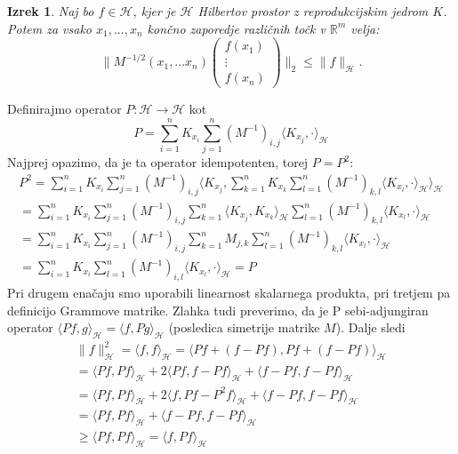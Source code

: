 \documentclass[12pt,a4paper]{amsart}
\theoremstyle{definition} %
\theoremstyle{plain} %
\newtheorem{izrek}[definicija]{Izrek}
\begin{document}
\begin{izrek}
Naj bo $f \in \mathcal{H}$, kjer je $\mathcal{H}$ Hilbertov prostor z reprodukcijskim jedrom $K$. Potem za vsako $x_1, ..., x_n$ končno zaporedje različnih točk v $\mathbb{R}^m$ velja:
$$
\bigg\|M^{-1/2}(x_1,...x_n)
\begin{pmatrix}
  f(x_1)  \\
  \vdots     \\
  f(x_n)
 \end{pmatrix}
\bigg\|_2 \leq \|f\|_{\mathcal{H}}.
$$
\end{izrek}
\proof 
Definirajmo operator $P: \mathcal{H} \rightarrow \mathcal{H}$ kot 
$$
P = \sum_{i=1}^n K_{x_i} \sum_{j=1}^n (M^{-1})_{i,j} \langle K_{x_j}, \cdot \rangle_{\mathcal{H}}
$$
Najprej opazimo, da je ta operator idempotenten, torej $P = P^2$:
\begin{gather*}
P^2 = \sum_{i=1}^n K_{x_i} \sum_{j=1}^n (M^{-1})_{i,j} \langle K_{x_j}, \sum_{k=1}^n K_{x_k} \sum_{l=1}^n (M^{-1})_{k,l} \langle K_{x_l}, \cdot \rangle_{\mathcal{H}} \rangle_{\mathcal{H}} \\
=  \sum_{i=1}^n K_{x_i} \sum_{j=1}^n (M^{-1})_{i,j} \sum_{k=1}^{n}  \langle K_{x_j}, K_{x_k} \rangle_{\mathcal{H}} \sum_{l=1}^n (M^{-1})_{k,l} \langle K_{x_l}, \cdot \rangle_{\mathcal{H}} \\
=  \sum_{i=1}^n K_{x_i} \sum_{j=1}^n (M^{-1})_{i,j}  \sum_{k=1}^n M_{j,k}  \sum_{l=1}^n (M^{-1})_{k,l} \langle K_{x_l}, \cdot \rangle_{\mathcal{H}} 
\\
= \sum_{i=1}^n K_{x_i} \sum_{l=1}^n (M^{-1})_{i,l}  \langle K_{x_l}, \cdot \rangle_{\mathcal{H}}  = P
\end{gather*}
Pri drugem enačaju smo uporabili linearnost skalarnega produkta, pri tretjem pa definicijo Grammove matrike. Zlahka tudi preverimo, da je P sebi-adjungiran operator $\langle Pf, g\rangle_{\mathcal{H}} = \langle f, Pg\rangle_{\mathcal{H}}$ (posledica simetrije matrike $M$). Dalje sledi 
\begin{gather*}
\|f\|_{\mathcal{H}}^2 = \langle f, f\rangle_{\mathcal{H}} = \langle Pf + (f - Pf), Pf + (f - Pf) \rangle_{\mathcal{H}} \\
= \langle Pf, Pf\rangle_{\mathcal{H}} + 2 \langle Pf,f -  Pf\rangle_{\mathcal{H}} + \langle f - Pf, f - Pf\rangle_{\mathcal{H}} \\
= \langle Pf, Pf\rangle_{\mathcal{H}} + 2 \langle f,Pf -  P^2 f\rangle_{\mathcal{H}} + \langle f - Pf, f - Pf\rangle_{\mathcal{H}} \\
= \langle Pf, Pf\rangle_{\mathcal{H}} +  \langle f - Pf, f - Pf\rangle_{\mathcal{H}} \\
\geq \langle Pf, Pf\rangle_{\mathcal{H}} = \langle f, Pf\rangle_{\mathcal{H}}
\end{gather*}
\end{document}
